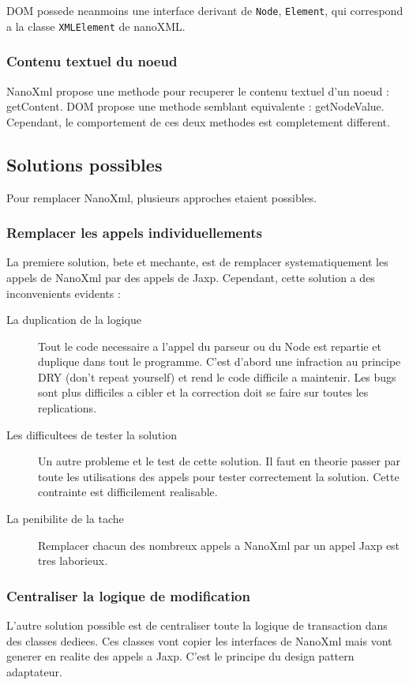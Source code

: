 DOM possede neanmoins une interface derivant de \verb|Node|, \verb|Element|, qui correspond a la classe \verb|XMLElement| de nanoXML.

\subsubsection{Contenu textuel du noeud}
NanoXml propose une methode pour recuperer le contenu textuel d'un noeud : getContent. DOM propose une methode semblant equivalente : getNodeValue. Cependant, le comportement de ces deux methodes est completement different.


\subsection{Solutions possibles}
Pour remplacer NanoXml, plusieurs approches etaient possibles. 
\subsubsection{Remplacer les appels individuellements}
La premiere solution, bete et mechante, est de remplacer systematiquement les appels de NanoXml par des appels de Jaxp. Cependant, cette solution a des inconvenients evidents :
\begin{description}
\item[La duplication de la logique] Tout le code necessaire a l'appel du parseur ou du Node est repartie et duplique dans tout le programme. C'est d'abord une infraction au principe DRY (don't repeat yourself) et rend le code difficile a maintenir. Les bugs sont plus difficiles a cibler et la correction doit se faire sur toutes les replications.
\item[Les difficultees de tester la solution] Un autre probleme et le test de cette solution. Il faut en theorie passer par toute les utilisations des appels pour tester correctement la solution. Cette contrainte est difficilement realisable.
\item[La penibilite de la tache] Remplacer chacun des nombreux appels a NanoXml par un appel Jaxp est tres laborieux. 
\end{description}
\subsubsection{Centraliser la logique de modification}
L'autre solution possible est de centraliser toute la logique de transaction dans des classes dediees. Ces classes vont copier les interfaces de NanoXml mais vont generer en realite des appels a Jaxp. C'est le principe du design pattern adaptateur.

